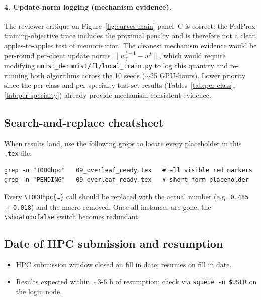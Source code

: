 \documentclass[11pt,a4paper]{article}
\newif\ifshowtodo
\newcommand{\TODOhpc}[1]{%
  \ifshowtodo\textcolor{red}{\textbf{[HPC PENDING: #1]}}\else#1\fi}
\begin{document}
\paragraph{4. Update-norm logging (mechanism evidence).} The reviewer
critique on Figure~\ref{fig:curves-main} panel~C is correct: the FedProx
training-objective trace includes the proximal penalty and is therefore
not a clean apples-to-apples test of memorisation. The cleanest mechanism
evidence would be per-round per-client update norms
$\lVert w_i^{t+1} - w^t \rVert$, which would require modifying
\texttt{mnist\_dermnist/fl/local\_train.py} to log this quantity and
re-running both algorithms across the 10 seeds ($\sim$25 GPU-hours).
Lower priority since the per-class and per-specialty test-set results
(Tables~\ref{tab:per-class}, \ref{tab:per-specialty}) already provide
mechanism-consistent evidence.

\subsection*{Search-and-replace cheatsheet}

When results land, use the following greps to locate every placeholder
in this \texttt{.tex} file:
\begin{verbatim}
grep -n "TODOhpc"   09_overleaf_ready.tex   # all visible red markers
grep -n "PENDING"   09_overleaf_ready.tex   # short-form placeholder
\end{verbatim}
Every \texttt{\textbackslash TODOhpc\{\ldots\}} call should be replaced
with the actual number (e.g.\ \texttt{0.485 $\pm$ 0.018}) and the macro
removed. Once all instances are gone, the
\texttt{\textbackslash showtodofalse} switch becomes redundant.

\subsection*{Date of HPC submission and resumption}

\begin{itemize}
\item HPC submission window closed on \TODOhpc{fill in date}; resumes on
  \TODOhpc{fill in date}.
\item Results expected within \TODOhpc{$\sim$3-6 h of resumption}; check
  via \texttt{squeue -u \$USER} on the login node.
\end{itemize}
\fi   %



\end{document}
